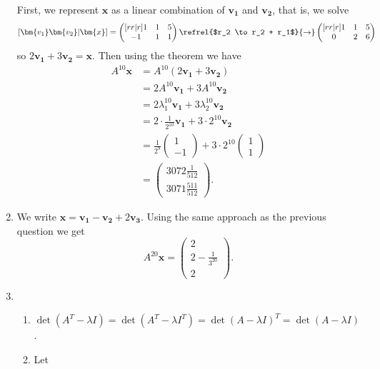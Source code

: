 \documentclass[english,12pt,a4paper]{scrartcl}
\renewcommand{\vec}[1]{\bm{#1}}
\begin{document}
\begin{enumerate}[start=6]
    First, we represent $\vec{x}$ as a linear combination of $\vec{v_1}$ and 
    $\vec{v_2}$, that is, we solve
    \[
      [\vec{v_1} \vec{v_2} | \vec{x}] =
      \begin{pmatrix}[rr|r]
        1 & 1 & 5 \\
        -1 & 1 & 1
      \end{pmatrix}
      \refrel{$r_2 \to r_2 + r_1$}{\to}
      \begin{pmatrix}[rr|r]
        1 & 1 & 5 \\
        0 & 2 & 6
      \end{pmatrix}
    \]
    so $2\vec{v_1} + 3\vec{v_2} = \vec{x}$. Then using the theorem we have
    \begin{align*}
      A^{10}\vec{x} &= A^{10}(2\vec{v_1} + 3\vec{v_2}) \\
      &= 2A^{10}\vec{v_1} + 3A^{10}\vec{v_2} \\
      &= 2\lambda_1^{10}\vec{v_1} + 3\lambda_2^{10}\vec{v_2} \\
      &= 2 \cdot \frac{1}{2^{10}} \vec{v_1} + 3 \cdot 2^{10}\vec{v_2} \\
      &= \frac{1}{2^9} \begin{pmatrix} 1 \\ -1 \end{pmatrix} + 3 \cdot 2^{10} 
      \begin{pmatrix} 1 \\ 1 \end{pmatrix} \\
      &= \begin{pmatrix} 3072 \frac{1}{512} \\ 3071 \frac{511}{512}
      \end{pmatrix}.
    \end{align*}
  \item %
    We write $\vec{x} = \vec{v_1} - \vec{v_2} + 2\vec{v_3}$. Using the same 
    approach as the previous question we get
    \[
      A^{20}\vec{x} =
      \begin{pmatrix}
        2 \\ 2 - \frac{1}{3^{20}} \\ 2
      \end{pmatrix}.
    \]
  \item %
    \begin{enumerate}
      \item $\det(A^T - \lambda I) = \det(A^T - \lambda I^T) = \det(A - \lambda 
        I)^T = \det(A - \lambda I)$.
      \item Let

\end{enumerate}
\end{enumerate}
\end{document}
